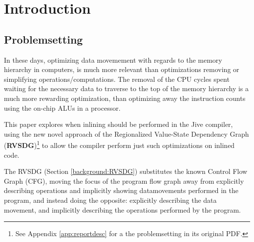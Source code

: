 
\section{Introduction}

\subsection{Problemsetting}

In these days, optimizing data movemement with regards to the memory hierarchy
in computers, is much more relevant than optimizations removing or simplifying
operations/computations. The removal of the CPU cycles spent waiting for the
necessary data to traverse to the top of the memory hierarchy is a much more
rewarding optimization, than optimizing away the instruction counts using the
on-chip ALUs in a processor.

This paper explores when inlining should be performed in the Jive compiler,
using the new novel approach of the Regionalized Value-State Dependency Graph
(\textbf{RVSDG})\footnote{See Appendix \ref{app:reportdesc} for a the
problemsetting in its original PDF.} to allow the compiler perform just such
optimizations on inlined code.

The RVSDG (Section \ref{background:RVSDG}) substitutes the known Control Flow
Graph (CFG), moving the focus of the program flow graph away from explicitly
describing operations and implicitly showing datamovements performed in the
program, and instead doing the opposite: explicitly describing the data
movement, and implicitly describing the operations performed by the program.
